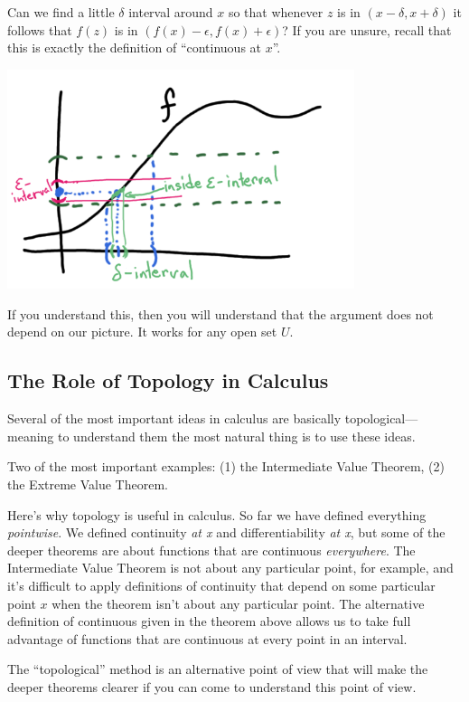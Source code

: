\documentclass[11pt]{book}
\numberwithin{example}{chapter}
\begin{document}
Can we find a little $\delta$ interval around $x$ so that whenever $z$ is in  $(x-\delta,x+\delta)$ it follows that  $f(z)$ is in $(f(x)-\epsilon, f(x)+\epsilon)$?  If you are unsure, recall that this is exactly the definition of ``continuous at $x$''. 


\begin{center}
\includegraphics[width=4in]{toplec1_8.png}
\end{center}


If you understand this, then you will understand that the argument does not depend on our picture.  It works for any open set $U$.  


\subsection{The Role of Topology in Calculus}

Several of the most important ideas in calculus are basically topological---meaning to understand them the most natural thing is to use these ideas.  

Two of the most important examples: (1) the Intermediate Value Theorem, (2) the Extreme Value Theorem.


Here's why topology is useful in calculus.  So far we have defined everything \emph{pointwise}.  We defined continuity \emph{at x} and differentiability \emph{at x}, but some of the deeper theorems are about functions that are continuous \emph{everywhere}.  The Intermediate Value Theorem is not about any particular point, for example, and it's difficult to apply definitions of continuity that depend on some particular point $x$ when the theorem isn't about any particular point.  The alternative definition of continuous given in the theorem above allows us to take full advantage of functions that are continuous at every point in an interval.  

The ``topological'' method is an alternative point of view that will make the deeper theorems clearer if you can come to understand this point of view.  
\end{document}
